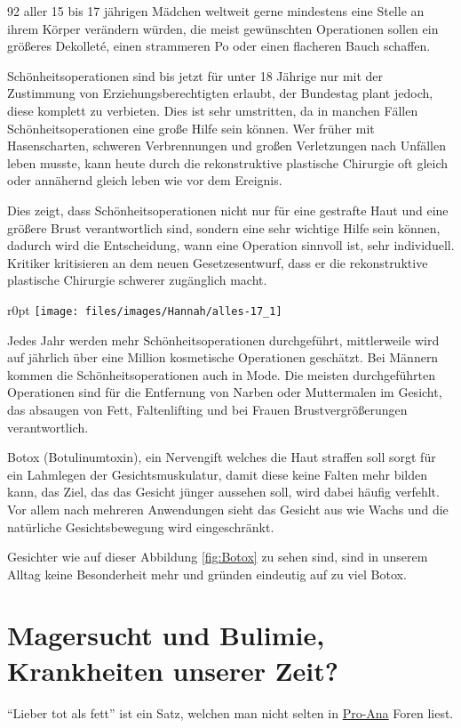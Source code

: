 92\Prozent{} aller 15 bis 17 jährigen Mädchen weltweit gerne mindestens eine Stelle an ihrem
Körper verändern würden, die meist gewünschten Operationen sollen ein größeres Dekolleté,
einen strammeren Po oder einen flacheren Bauch schaffen.

Schönheitsoperationen sind bis jetzt für unter 18 Jährige nur mit der Zustimmung von
Erziehungsberechtigten erlaubt, der Bundestag plant jedoch, diese komplett zu verbieten. Dies ist
sehr umstritten, da in manchen Fällen Schönheitsoperationen eine große Hilfe sein können. Wer früher
mit Hasenscharten, schweren Verbrennungen und großen Verletzungen nach Unfällen leben musste, kann
heute durch die rekonstruktive plastische Chirurgie oft gleich oder annähernd gleich leben wie vor
dem Ereignis.

Dies zeigt, dass Schönheitsoperationen nicht nur für eine gestrafte Haut und eine größere Brust
verantwortlich sind, sondern eine sehr wichtige Hilfe sein können, dadurch wird die Entscheidung,
wann eine Operation sinnvoll ist, sehr individuell. Kritiker kritisieren an dem neuen
Gesetzesentwurf, dass er die rekonstruktive plastische Chirurgie schwerer zugänglich macht.

\begin{wrapfigure}{r}{0pt}
	\texttt{[image: files/images/Hannah/alles-17\_1]}%
	\label{fig:Botox}
\end{wrapfigure}
Jedes Jahr werden mehr Schönheitsoperationen durchgeführt, mittlerweile wird auf jährlich über eine
Million kosmetische Operationen geschätzt. Bei Männern kommen die Schönheitsoperationen auch in Mode.
Die meisten durchgeführten Operationen sind für die Entfernung von Narben oder Muttermalen im
Gesicht, das absaugen von Fett, Faltenlifting und bei Frauen Brustvergrößerungen verantwortlich.

Botox (Botulinumtoxin), ein Nervengift welches die Haut straffen soll sorgt für ein Lahmlegen der
Gesichtsmuskulatur, damit diese keine Falten mehr bilden kann, das Ziel, das das Gesicht jünger
aussehen soll, wird dabei häufig verfehlt. Vor allem nach mehreren Anwendungen sieht das Gesicht aus
wie Wachs und die natürliche Gesichtsbewegung wird eingeschränkt.

Gesichter wie auf dieser Abbildung \vref{fig:Botox} zu sehen sind, sind in unserem Alltag
keine Besonderheit mehr und gründen eindeutig auf zu viel Botox.

\section{Magersucht und Bulimie, Krankheiten unserer Zeit?}
\enquote{Lieber tot als fett} ist ein Satz, welchen man nicht selten in
\href{http://de.wikipedia.org/wiki/Pro-Ana}{Pro-Ana} Foren liest.

